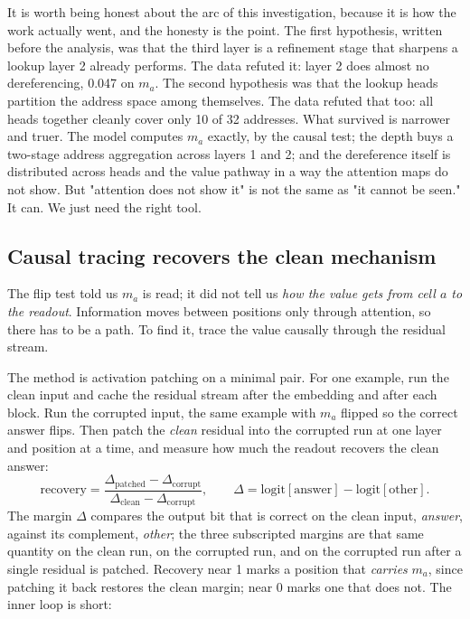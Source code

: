 It is worth being honest about the arc of this investigation, because it is how
the work actually went, and the honesty is the point. The first hypothesis,
written before the analysis, was that the third layer is a refinement stage that
sharpens a lookup layer 2 already performs. The data refuted it: layer 2 does
almost no dereferencing, 0.047 on $m_a$. The second hypothesis was that the
lookup heads partition the address space among themselves. The data refuted that
too: all heads together cleanly cover only 10 of 32 addresses. What survived is
narrower and truer. The model computes $m_a$ exactly, by the causal test; the
depth buys a two-stage address aggregation across layers 1 and 2; and the
dereference itself is distributed across heads and the value pathway in a way the
attention maps do not show. But "attention does not show it" is not the same as
"it cannot be seen." It can. We just need the right tool.

\subsection*{Causal tracing recovers the clean mechanism}

The flip test told us $m_a$ is read; it did not tell us \emph{how the value gets
from cell $a$ to the readout}. Information moves between positions only through
attention, so there has to be a path. To find it, trace the value causally
through the residual stream.

The method is activation patching on a minimal pair. For one example, run the
clean input and cache the residual stream after the embedding and after each
block. Run the corrupted input, the same example with $m_a$ flipped so the
correct answer flips. Then patch the \emph{clean} residual into the corrupted run
at one layer and position at a time, and measure how much the readout recovers
the clean answer:
\[
\text{recovery} =
\frac{\Delta_{\text{patched}} - \Delta_{\text{corrupt}}}
     {\Delta_{\text{clean}} - \Delta_{\text{corrupt}}},
\qquad
\Delta = \text{logit}[\text{answer}] - \text{logit}[\text{other}].
\]
The margin $\Delta$ compares the output bit that is correct on the clean input,
\emph{answer}, against its complement, \emph{other}; the three subscripted
margins are that same quantity on the clean run, on the corrupted run, and on the
corrupted run after a single residual is patched. Recovery near 1 marks a
position that \emph{carries} $m_a$, since patching it back restores the clean
margin; near 0 marks one that does not. The inner loop is short:

